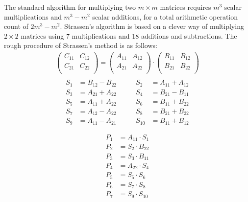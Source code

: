 \documentclass[UTF8]{ctexart}
\begin{document}
The standard algorithm for multiplying two $m\times m$ matrices requires $m^3$ scalar multiplications and $m^3 -m^2$ scalar additions, for a total arithmetic operation count of $2m^3 -m^2$. Strassen's algorithm is based on a clever way of multiplying $2\times 2$ matrices using 7 multiplications and 18 additions and subtractions. The rough procedure of Strassen's method is as follows:
\begin{equation}
  \begin{aligned}
    \left(\begin{array}{cc} C_{11}&C_{12}\\C_{21}&C_{22}\\ \end{array}\right)=\left(\begin{array}{cc} A_{11}&A_{12}\\A_{21}&A_{22}\\ \end{array}\right)\cdot \left(\begin{array}{cc} B_{11}&B_{12}\\B_{21}&B_{22}\\ \end{array}\right) \\
  \end{aligned}
\end{equation}
\begin{equation}
  \begin{aligned}
    S_{1} & =B_{12}-B_{22}\qquad & S_{2}  & =A_{11}+A_{12} \\
    S_{3} & =A_{21}+A_{22}\qquad & S_{4}  & =B_{21}-B_{11} \\
    S_{5} & =A_{11}+A_{22}\qquad & S_{6}  & =B_{11}+B_{22} \\
    S_{7} & =A_{12}-A_{22}\qquad & S_{8}  & =B_{21}+B_{22} \\
    S_{9} & =A_{11}-A_{21}\qquad & S_{10} & =B_{11}+B_{12}
  \end{aligned}
\end{equation}

\begin{equation}
  \begin{aligned}
    P_1 & =A_{11}\cdot S_1   \\
    P_2 & =S_{2}\cdot B_{22} \\
    P_3 & =S_3 \cdot B_{11}  \\
    P_4 & =A_{22}\cdot S_4   \\
    P_5 & = S_5 \cdot S_6    \\
    P_6 & = S_7 \cdot S_8    \\
    P_7 & =S_9 \cdot S_{10}
  \end{aligned}
\end{equation}
\end{document}
